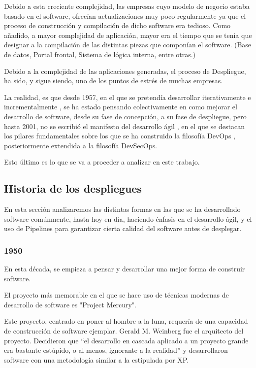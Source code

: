 \documentclass[12pt]{report} %
\begin{document}
Debido a esta creciente complejidad, las empresas cuyo modelo de negocio estaba basado en el software, ofrecían actualizaciones muy poco regularmente ya que el proceso de construcción y compilación de dicho software era tedioso.
Como añadido, a mayor complejidad de aplicación, mayor era el tiempo que se tenia que designar a la compilación de las distintas piezas que componían el software. (Base de datos, Portal frontal, Sistema de lógica interna, entre otras.)

Debido a la complejidad de las aplicaciones generadas, el proceso de Despliegue, ha sido, y sigue siendo, uno de los puntos de estrés de muchas empresas.

La realidad, es que desde 1957, en el que se pretendía desarrollar iterativamente e incrementalmente \cite{IID}, se ha estado pensando colectivamente en como mejorar el desarrollo de software, desde su fase de concepción, a su fase de despliegue, pero hasta 2001, no se escribió el manifesto del desarrollo ágil \cite{agile}, en el que se destacan los pilares fundamentales sobre los que se ha construido la filosofía DevOps \cite{CD-TF}, posteriormente extendida a la filosofía DevSecOps.

Esto último es lo que se va a proceder a analizar en este trabajo.


\subsection{Historia de los despliegues}

En esta sección analizaremos las distintas formas en las que se ha desarrollado software comúnmente, hasta hoy en día, haciendo énfasis en el desarrollo ágil, y el uso de Pipelines para garantizar cierta calidad del software antes de desplegar.

\subsubsection{1950}

En esta década, se empieza a pensar y desarrollar una mejor forma de construir software. \par
El proyecto más memorable en el que se hace uso de técnicas modernas de desarrollo de software es "Project Mercury". \par
Este proyecto, centrado en poner al hombre a la luna, requería de una capacidad de construcción de software ejemplar.
Gerald M. Weinberg fue el arquitecto del proyecto.
Decidieron que ``el desarrollo en cascada aplicado a un proyecto grande era bastante estúpido, o al menos, ignorante a la realidad'' \cite{GW-PM} y desarrollaron software con una metodología similar a la estipulada por XP.
\end{document}
